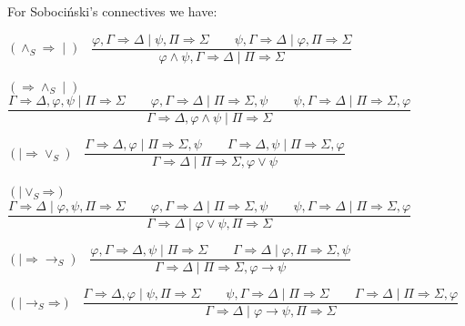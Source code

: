 \documentclass[11pt,a4paper,titlepage]{article}
\theoremstyle{definition}
\newcommand{\3}{\vspace{.3in}}
\newcommand{\2}{\vspace{.2in}}
\newcommand{\1}{\vspace{.1in}}
\newcommand{\5}{\vspace{.05in}}
\begin{document}
\1

For Soboci\'nski's connectives we have:

\begin{flushleft}
	$(\mathord{\wedge_S\Rightarrow}\mid)$ \ $\dfrac{\varphi, \Gamma
		\Rightarrow \Delta \mid \psi, \Pi\Rightarrow\Sigma \qquad \psi, \Gamma\Rightarrow\Delta \mid \varphi, \Pi\Rightarrow\Sigma}{\varphi\wedge\psi, \Gamma\Rightarrow\Delta \mid \Pi\Rightarrow\Sigma}$
\end{flushleft} 

\begin{flushleft}
	{\footnotesize $(\mathord{\Rightarrow\wedge_S}\mid)$ \ $\dfrac{\Gamma
			\Rightarrow \Delta, \varphi, \psi \mid \Pi\Rightarrow\Sigma \qquad\varphi, \Gamma\Rightarrow\Delta \mid
			\Pi \Rightarrow \Sigma, \psi \qquad \psi, \Gamma\Rightarrow\Delta \mid \Pi\Rightarrow\Sigma, \varphi } {\Gamma
			\Rightarrow \Delta, \varphi\wedge\psi \mid \Pi\Rightarrow\Sigma}$}
	
\end{flushleft}
\begin{flushleft}
	$(\mathord{\mid\Rightarrow}\mathord{\vee_S})$ \ $\dfrac{\Gamma
		\Rightarrow \Delta, \varphi \mid \Pi\Rightarrow\Sigma, \psi \qquad \Gamma\Rightarrow\Delta, \psi\mid \Pi\Rightarrow\Sigma, \varphi}{\Gamma\Rightarrow\Delta \mid \Pi\Rightarrow\Sigma, \varphi\vee\psi}$
\end{flushleft} 

\begin{flushleft}
	{\footnotesize $(\mathord{\mid \vee_S}\mathord{\Rightarrow})$ \ $\dfrac{\Gamma
			\Rightarrow \Delta \mid \varphi, \psi, \Pi\Rightarrow\Sigma \qquad\varphi,  \Gamma\Rightarrow\Delta \mid
			\Pi \Rightarrow \Sigma, \psi \qquad \psi, \Gamma\Rightarrow\Delta \mid \Pi\Rightarrow\Sigma, \varphi } {\Gamma
			\Rightarrow \Delta \mid \varphi\vee\psi, \Pi\Rightarrow\Sigma}$}
\end{flushleft}

\begin{flushleft}
	$(\mathord{\mid\Rightarrow}\mathord{\rightarrow_S})$ \ $\dfrac{\varphi, \Gamma
		\Rightarrow \Delta, \psi \mid \Pi\Rightarrow\Sigma \qquad \Gamma\Rightarrow\Delta \mid \varphi, \Pi\Rightarrow\Sigma, \psi}{\Gamma\Rightarrow\Delta \mid \Pi\Rightarrow\Sigma, \varphi\rightarrow\psi}$
\end{flushleft} 

\begin{flushleft}
	{\small $(\mathord{\mid \rightarrow_S}\mathord{\Rightarrow})$ \ $\dfrac{\Gamma
			\Rightarrow \Delta, \varphi \mid \psi, \Pi\Rightarrow\Sigma \qquad\psi, \Gamma\Rightarrow\Delta \mid
			\Pi \Rightarrow \Sigma \qquad \Gamma\Rightarrow\Delta \mid \Pi\Rightarrow\Sigma, \varphi} {\Gamma
			\Rightarrow \Delta \mid \varphi\rightarrow\psi, \Pi\Rightarrow\Sigma}$}
\end{flushleft}
\end{document}
